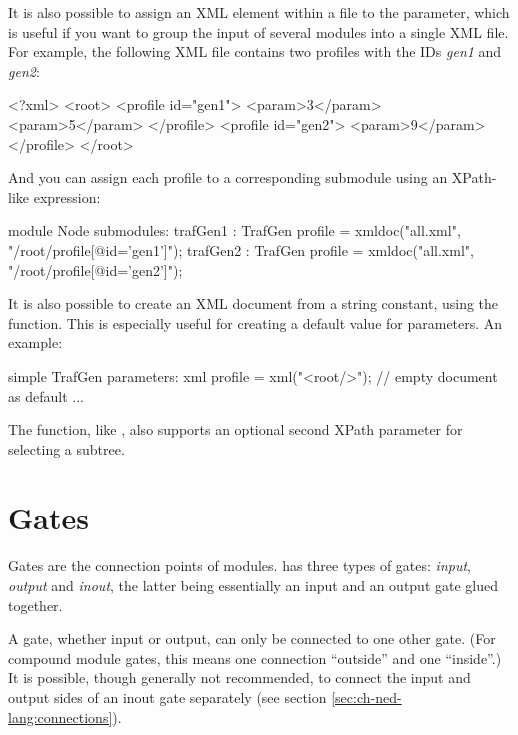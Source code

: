 It is also possible to assign an XML element within a file to the parameter,
which is useful if you want to group the input of several modules into
a single XML file. For example, the following XML file contains two profiles
with the IDs \textit{gen1} and \textit{gen2}:

\begin{filelisting}
<?xml>
<root>
    <profile id="gen1">
          <param>3</param>
          <param>5</param>
    </profile>
    <profile id="gen2">
          <param>9</param>
    </profile>
</root>
\end{filelisting}

And you can assign each profile to a corresponding submodule using an XPath-like
expression:

\begin{ned}
module Node {
    submodules:
        trafGen1 : TrafGen {
            profile = xmldoc("all.xml", "/root/profile[@id='gen1']");
        }
        trafGen2 : TrafGen {
            profile = xmldoc("all.xml", "/root/profile[@id='gen2']");
        }
}
\end{ned}

It is also possible to create an XML document from a string constant, using
the  function. This is especially useful for creating a
default value for  parameters. An example:

\begin{ned}
simple TrafGen {
    parameters:
        xml profile = xml("<root/>"); // empty document as default
        ...
}
\end{ned}

The  function, like , also supports an
optional second XPath parameter for selecting a subtree.




\section{Gates}
\label{sec:ch-ned-lang:gates}

Gates are the connection points of modules.  {\opp} has three types of
gates: \textit{input}, \textit{output} and \textit{inout}, the latter being
essentially an input and an output gate glued together.

A gate, whether input or output, can only be connected to one other
gate. (For compound module gates, this means one connection ``outside'' and
one ``inside''.)  It is possible, though generally not recommended, to
connect the input and output sides of an inout gate separately (see section
\ref{sec:ch-ned-lang:connections}).

